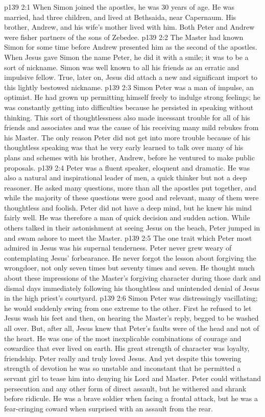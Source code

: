 \vs p139 2:1 When Simon joined the apostles, he was 30 years of age. He was married, had three children, and lived at Bethsaida, near Capernaum. His brother, Andrew, and his wife’s mother lived with him. Both Peter and Andrew were fisher partners of the sons of Zebedee.
\vs p139 2:2 The Master had known Simon for some time before Andrew presented him as the second of the apostles. When Jesus gave Simon the name Peter, he did it with a smile; it was to be a sort of nickname. Simon was well known to all his friends as an erratic and impulsive fellow. True, later on, Jesus did attach a new and significant import to this lightly bestowed nickname.
\vs p139 2:3 \pc Simon Peter was a man of impulse, an optimist. He had grown up permitting himself freely to indulge strong feelings; he was constantly getting into difficulties because he persisted in speaking without thinking. This sort of thoughtlessness also made incessant trouble for all of his friends and associates and was the cause of his receiving many mild rebukes from his Master. The only reason Peter did not get into more trouble because of his thoughtless speaking was that he very early learned to talk over many of his plans and schemes with his brother, Andrew, before he ventured to make public proposals.
\vs p139 2:4 Peter was a fluent speaker, eloquent and dramatic. He was also a natural and inspirational leader of men, a quick thinker but not a deep reasoner. He asked many questions, more than all the apostles put together, and while the majority of these questions were good and relevant, many of them were thoughtless and foolish. Peter did not have a deep mind, but he knew his mind fairly well. He was therefore a man of quick decision and sudden action. While others talked in their astonishment at seeing Jesus on the beach, Peter jumped in and swam ashore to meet the Master.
\vs p139 2:5 \pc The one trait which Peter most admired in Jesus was his supernal tenderness. Peter never grew weary of contemplating Jesus’ forbearance. He never forgot the lesson about forgiving the wrongdoer, not only seven times but seventy times and seven. He thought much about these impressions of the Master’s forgiving character during those dark and dismal days immediately following his thoughtless and unintended denial of Jesus in the high priest’s courtyard.
\vs p139 2:6 \pc Simon Peter was distressingly vacillating; he would suddenly swing from one extreme to the other. First he refused to let Jesus wash his feet and then, on hearing the Master’s reply, begged to be washed all over. But, after all, Jesus knew that Peter’s faults were of the head and not of the heart. He was one of the most inexplicable combinations of courage and cowardice that ever lived on earth. His great strength of character was loyalty, friendship. Peter really and truly loved Jesus. And yet despite this towering strength of devotion he was so unstable and inconstant that he permitted a servant girl to tease him into denying his Lord and Master. Peter could withstand persecution and any other form of direct assault, but he withered and shrank before ridicule. He was a brave soldier when facing a frontal attack, but he was a fear\hyp{}cringing coward when surprised with an assault from the rear.
